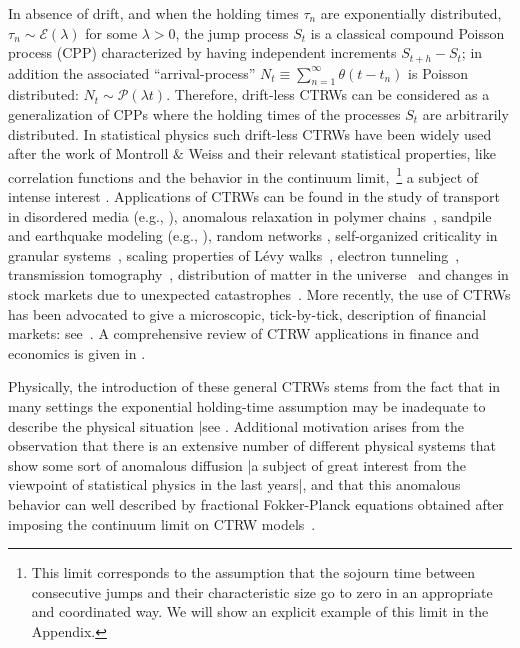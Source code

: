 \documentclass[english,aps,a4paper,twocolumn,showpacs,showkeys,amsfonts,amsmath,amssymb,amscd,nofootinbib]{revtex4}
\newcommand{\1}{\'\i}
\begin{document}
In absence of drift, and when  the holding times $\tau_n$ are exponentially distributed, $\tau_n\sim  \mathcal  E(\lambda)$ for some $\lambda >0$, the jump process  $S_t$ is  a  classical compound Poisson process (CPP)
characterized by having     independent increments  $S_{t+h}- S_t$; in addition the
    associated  ``arrival-process''   $N_t\equiv\sum_{n=1}^\infty \theta(t-t_n)$  is
  Poisson
 distributed:   $N_t \sim
\mathcal P(\lambda
 t)$. Therefore, drift-less CTRWs can be considered as a generalization of CPPs where the holding times of the  
processes $S_t$ are arbitrarily distributed. In  statistical physics  such  drift-less  CTRWs      have been widely
used  after the work of Montroll $\&$ Weiss \cite{mw65,w94} and
their relevant statistical properties, like correlation functions
and the behavior in the continuum limit,~\footnote{This limit corresponds to the assumption that the sojourn time between consecutive jumps and their characteristic size go to zero in an appropriate and coordinated way. We will show an explicit example of this limit in the Appendix.}
 a subject of intense interest
\cite{JT74,JT76,Go,Sch}.  Applications of CTRWs can be found in the study of transport in
disordered media (e.g., \cite{Sch,ms84,Weiss-porra,Margolin1}),
anomalous relaxation in polymer chains~\cite{Hu}, sandpile and earthquake 
 modeling (e.g., \cite{hs02,Me03}),   random networks \cite{Be},
 self-organized
criticality in granular systems~\cite{Bo},   scaling properties of  L\'evy walks~\cite{Ku}, electron tunneling~\cite{Gu}, transmission
 tomography~\cite{OW,OW2},
  distribution of matter in the universe~\cite{Os71} and changes  in  stock
markets due to unexpected catastrophes~\cite{m76}. More
recently,
 the use of CTRWs has been advocated to give a microscopic, tick-by-tick,
description of financial markets: see~\cite{mmw03,mmp05,mmpw06,mpmlmm05,s09}. A comprehensive review of CTRW applications in finance and economics is given in \cite{s06}.

Physically,
 the introduction of these general CTRWs stems from the fact that
in  many settings the exponential holding-time   assumption  may
be inadequate to describe the physical situation |see \cite{Me03,mmw03}.  Additional  motivation arises from
the observation that there is an extensive number of different physical systems that show some sort of anomalous diffusion |a subject of great interest from the viewpoint of statistical physics in the last years|, and that this anomalous behavior can well described by fractional Fokker-Planck equations obtained after imposing the continuum limit on CTRW models~\cite{%
Metzler,s07,m07}.
\end{document}
